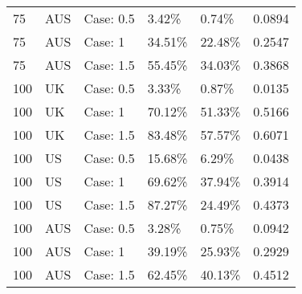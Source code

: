 \begin{table}[ht]
\begin{tabular}{llllll}
  75 & AUS & Case: 0.5 & 3.42\% & 0.74\% & 0.0894 \\ 
  75 & AUS & Case: 1 & 34.51\% & 22.48\% & 0.2547 \\ 
  75 & AUS & Case: 1.5 & 55.45\% & 34.03\% & 0.3868 \\ 
  100 & UK & Case: 0.5 & 3.33\% & 0.87\% & 0.0135 \\ 
  100 & UK & Case: 1 & 70.12\% & 51.33\% & 0.5166 \\ 
  100 & UK & Case: 1.5 & 83.48\% & 57.57\% & 0.6071 \\ 
  100 & US & Case: 0.5 & 15.68\% & 6.29\% & 0.0438 \\ 
  100 & US & Case: 1 & 69.62\% & 37.94\% & 0.3914 \\ 
  100 & US & Case: 1.5 & 87.27\% & 24.49\% & 0.4373 \\ 
  100 & AUS & Case: 0.5 & 3.28\% & 0.75\% & 0.0942 \\ 
  100 & AUS & Case: 1 & 39.19\% & 25.93\% & 0.2929 \\ 
  100 & AUS & Case: 1.5 & 62.45\% & 40.13\% & 0.4512 \\ 
   \hline
\end{tabular}
\end{table}
